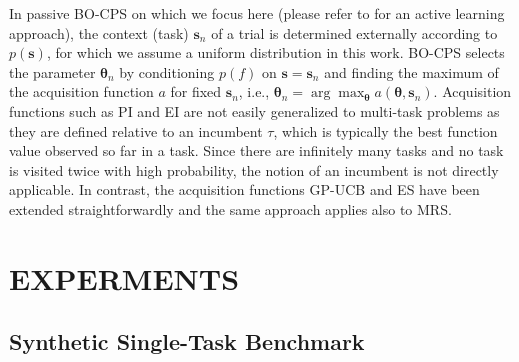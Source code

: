 \documentclass[10pt,letterpaper]{article} %
\begin{document}
In passive BO-CPS on which we focus here (please refer to
\citet{metzen_active_2015} for an active learning approach), the context (task)
$\mathbf{s}_n$ of a trial is determined externally according to $p(\mathbf{s})$, 
for which we assume a uniform distribution in this work.
BO-CPS selects the parameter $\mathbf{\theta}_n$ by conditioning $p(f)$ on
$\mathbf{s}=\mathbf{s}_n$ and finding the maximum of the acquisition function
$a$ for fixed $\mathbf{s}_n$, i.e., $\mathbf{\theta}_n =
\arg\max_\mathbf{\theta} a(\mathbf{\theta}, \mathbf{s}_n)$. Acquisition
functions such as PI and EI are not easily generalized to multi-task problems as they are
defined relative to an incumbent $\tau$, which is typically the best function
value observed so far in a task. Since there are infinitely many tasks and no
task is visited twice with high probability, the notion of an incumbent is not
directly applicable.  In contrast, the acquisition functions GP-UCB
\cite{srinivas_gaussian_2010} and ES \cite{metzen_bayesian_2015} have been extended
straightforwardly and the same approach applies also to MRS.

\section{EXPERMENTS}

\subsection{Synthetic Single-Task Benchmark} \label{Section:ResultsSingleTask}
\end{document}
